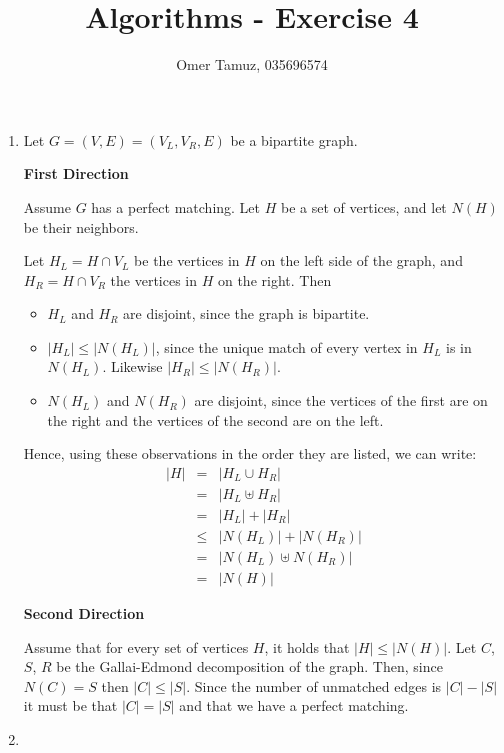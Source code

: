 \documentclass[11pt]{article} \usepackage{amssymb}
\begin{document}
\title{Algorithms - Exercise 4}

 \author{Omer Tamuz, 035696574}
\maketitle

\begin{enumerate}


\item 
  Let $G=(V,E)=(V_L,V_R,E)$ be a bipartite graph.
  
  {\bf First Direction}
  
  Assume $G$ has a perfect matching. Let $H$ be a set of vertices, and let 
  $N(H)$ be their neighbors. 
  
  Let $H_L=H\cap V_L$ be the vertices in $H$ on the left side of the graph, 
  and $H_R=H\cap V_R$ the
  vertices in $H$ on the right. Then
  \begin{itemize}
  \item $H_L$ and $H_R$ are disjoint, since the graph is bipartite.
  \item $|H_L| \leq |N(H_L)|$, since the unique match of every vertex in $H_L$
    is in $N(H_L)$. Likewise $|H_R| \leq |N(H_R)|$.
  \item $N(H_L)$ and $N(H_R)$ are disjoint, since the vertices of the first are
    on the right and the vertices of the second are on the left. 
  \end{itemize}
  
  Hence, using these observations in the order they are listed, we can write: 
  \begin{eqnarray*}
    |H|&=&|H_L\cup H_R| 
    \\ &=& |H_L \uplus H_R| 
    \\ &=& |H_L|+|H_R| 
    \\ &\leq& |N(H_L)| + |N(H_R)|
    \\ &=& |N(H_L) \uplus N(H_R)|
    \\ &=& |N(H)|
  \end{eqnarray*}
  
  {\bf Second Direction}
  
  Assume that for every set of vertices $H$, it holds that $|H| \leq |N(H)|$. Let
  $C$, $S$, $R$ be the Gallai-Edmond decomposition of the graph. Then, since
  $N(C)=S$ then $|C| \leq |S|$. Since the number of unmatched edges is 
  $|C|-|S|$ it must be that $|C|=|S|$ and that we have a perfect matching.

\item


\end{enumerate}
\end{document}

